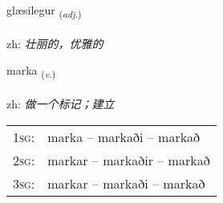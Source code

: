 \documentclass[frontgrid, backgrid]{flacards}\usepackage[]{graphicx}\usepackage[]{color}
\begin{document}
\renewcommand{\flhead}{\vskip5pt \fboxsep=0pt {\small\bfseries\footnotesize Lýsingarorð | 形容词}}
\renewcommand{\fcfoot}{\vskip5pt \fboxsep=0pt \hspace{2pt}{\small\bfseries\footnotesize 2K}}

\renewcommand{\blhead}{\vskip5pt {\small\bfseries\footnotesize Lýsingarorð | 形容词 }}
\renewcommand{\bcfoot}{\vskip5pt \hspace{2pt}{\small\bfseries\footnotesize 2K}}


{glæsilegur \small{\textsubscript{(\textit{adj.})}} \\[1ex] %
\textphonetic{[klaiːsɪlɛɣʏr]} \\
zh: \emph{壮丽的，优雅的} \\  [2ex]
\renewcommand*{\arraystretch}{0.8}
}

\renewcommand{\flhead}{\vskip5pt \fboxsep=0pt {\small\bfseries\footnotesize Sagnorð | 动词}}
\renewcommand{\fcfoot}{\vskip5pt \fboxsep=0pt \hspace{2pt}{\small\bfseries\footnotesize 2K}}

\renewcommand{\blhead}{\vskip5pt {\small\bfseries\footnotesize Sagnorð | 动词 }}
\renewcommand{\bcfoot}{\vskip5pt \hspace{2pt}{\small\bfseries\footnotesize 2K}}


{marka \small{\textsubscript{(\textit{v.})}} \\[1ex] %
\textphonetic{[mar̥ka]} \\
zh: \emph{做一个标记；建立} \\  [2ex]
\renewcommand*{\arraystretch}{0.8}
\begin{tabular}{p{1cm}l}
\textsc{1sg}: & marka -- markaði -- markað \\ 
\textsc{2sg}: & markar -- markaðir -- markað \\ 
\textsc{3sg}: & markar -- markaði -- markað \\ 
\end{tabular}
}
\end{document}
